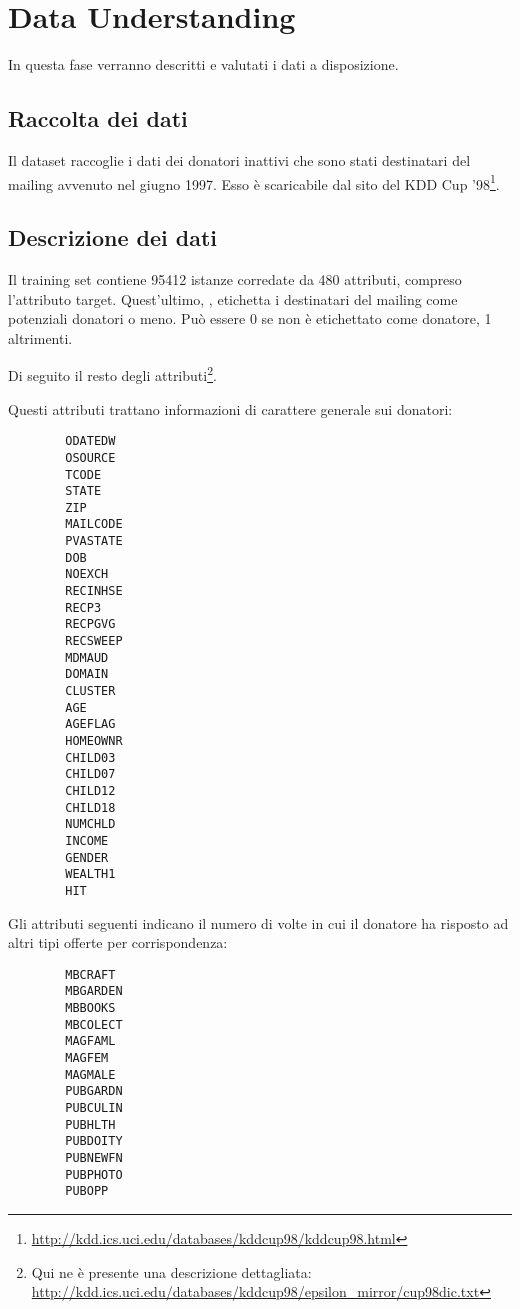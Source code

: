 \chapter{Data Understanding}
\label{ch:datund}
In questa fase verranno descritti e valutati i dati a disposizione.

\section{Raccolta dei dati}

Il dataset raccoglie i dati dei donatori inattivi che sono stati destinatari del mailing avvenuto nel giugno 1997. Esso è scaricabile dal sito del KDD Cup '98\footnote{\url{http://kdd.ics.uci.edu/databases/kddcup98/kddcup98.html}}.

\section{Descrizione dei dati}
Il training set contiene 95412 istanze corredate da 480 attributi, compreso l'attributo target. Quest'ultimo, \tb{}, etichetta i destinatari del mailing come potenziali donatori o meno. Può essere 0 se non è etichettato come donatore, 1 altrimenti.

Di seguito il resto degli attributi\footnote{Qui ne è presente una descrizione dettagliata: \url{http://kdd.ics.uci.edu/databases/kddcup98/epsilon_mirror/cup98dic.txt}}.


Questi attributi trattano informazioni di carattere generale sui donatori:
\begin{multicols}{3}
	\footnotesize
	\begin{verbatim}
		ODATEDW
		OSOURCE
		TCODE
		STATE
		ZIP
		MAILCODE
		PVASTATE
		DOB
		NOEXCH
		RECINHSE
		RECP3
		RECPGVG
		RECSWEEP
		MDMAUD
		DOMAIN
		CLUSTER
		AGE
		AGEFLAG
		HOMEOWNR
		CHILD03
		CHILD07
		CHILD12
		CHILD18
		NUMCHLD
		INCOME
		GENDER
		WEALTH1
		HIT
	\end{verbatim}
\end{multicols}

Gli attributi seguenti indicano il numero di volte in cui il donatore ha risposto ad altri tipi offerte per corrispondenza:

\begin{multicols}{3}
	\begin{verbatim}
		MBCRAFT
		MBGARDEN
		MBBOOKS
		MBCOLECT
		MAGFAML
		MAGFEM
		MAGMALE
		PUBGARDN
		PUBCULIN
		PUBHLTH
		PUBDOITY
		PUBNEWFN
		PUBPHOTO
		PUBOPP
	\end{verbatim}
\end{multicols}	

